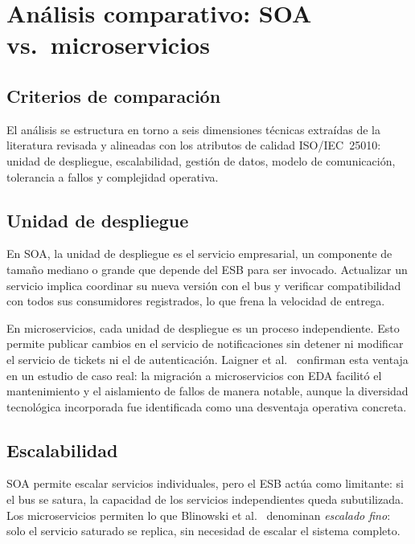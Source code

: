 \documentclass[12pt, a4paper]{article}
\begin{document}
\section{Análisis comparativo: SOA vs.\ microservicios}
\label{sec:analisis}

\subsection{Criterios de comparación}

El análisis se estructura en torno a seis dimensiones técnicas extraídas de la
literatura revisada y alineadas con los atributos de calidad ISO/IEC~25010:
unidad de despliegue, escalabilidad, gestión de datos, modelo de comunicación, tolerancia a fallos y complejidad operativa.

\subsection{Unidad de despliegue}

En SOA, la unidad de despliegue es el servicio empresarial, un componente de
tamaño mediano o grande que depende del ESB para ser invocado. Actualizar un
servicio implica coordinar su nueva versión con el bus y verificar compatibilidad
con todos sus consumidores registrados, lo que frena la velocidad de entrega.

En microservicios, cada unidad de despliegue es un proceso independiente. Esto
permite publicar cambios en el servicio de notificaciones sin detener ni modificar
el servicio de tickets ni el de autenticación. Laigner et al.~\cite{laigner2020}
confirman esta ventaja en un estudio de caso real: la migración a microservicios
con EDA facilitó el mantenimiento y el aislamiento de fallos de manera notable,
aunque la diversidad tecnológica incorporada fue identificada como una desventaja
operativa concreta.

\subsection{Escalabilidad}

SOA permite escalar servicios individuales, pero el ESB actúa como limitante: si
el bus se satura, la capacidad de los servicios independientes queda subutilizada.
Los microservicios permiten lo que Blinowski et al.~\cite{blinowski2022} denominan
\textit{escalado fino}: solo el servicio saturado se replica, sin necesidad de
escalar el sistema completo.
\end{document}
